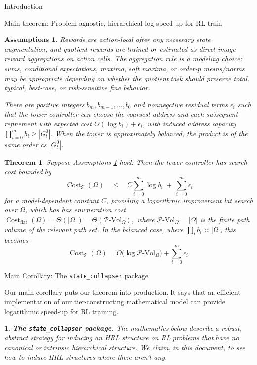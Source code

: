 \documentclass[11pt]{article}
\newtheorem{assumptions}[subsubsection]{Assumptions}
\newtheorem{ermark}[subsubsection]{}
\newtheorem{theorem}[subsubsection]{Theorem}
\newcommand{\PVol}{\mathcal{P}\text{-}\mathrm{Vol}}
\newcommand{\cost}{\operatorname{Cost}}
\begin{document}
\begin{section}{Introduction}
\begin{subsection}{Main theorem: Problem agnostic, hierarchical log speed-up for RL train}
\begin{assumptions}\label{ass: simple ass}
Rewards are action-local after any necessary state augmentation, and quotient rewards are trained or estimated as direct-image reward aggregations on action cells. The aggregation rule is a modeling choice: sums, conditional expectations, maxima, soft maxima, or order-$p$ means/norms may be appropriate depending on whether the quotient task should preserve total, typical, best-case, or risk-sensitive fine behavior.
 

There are positive integers \(b_m,b_{m-1},\ldots,b_0\) and nonnegative residual terms \(\epsilon_i\) such that the tower controller can choose the coarsest address and each subsequent refinement with expected cost
$O(\log b_i)+\epsilon_i$, with induced address capacity $\prod_{i=0}^{m} b_i \ge |G^{0}_{t}|$.
When the tower is approximately balanced, the product is of the same order as \(|G^{0}_{t}|\).
\end{assumptions}


\begin{theorem}\label{theorem: main}
Suppose Assumptions \ref{ass: simple ass} hold.  Then the tower controller has search cost bounded by
$$
    \cost_{\mathcal{T}}(\Omega)
    \quad\le\quad
    C\sum_{i=0}^{m}\log b_i \;+\; \sum_{i=0}^{m}\epsilon_i
$$
for a model-dependent constant \(C\), providing a logarithmic improvement lat search over \(\Omega\), which has has enumeration cost $
    \cost_{\mathrm{flat}}(\Omega)=\Theta(|\Omega|)=\Theta(\PVol_{\Omega}),
$
where \(\PVol_{\Omega}=|\Omega|\) is the finite path volume of the relevant path set.  In the balanced case, where \(\prod_i b_i\asymp |\Omega|\), this becomes
$$
    \cost_{\mathcal{T}}(\Omega)
    =O\bigl(\log \PVol_{\Omega}\bigr)+\sum_{i=0}^{m}\epsilon_i.
$$
\end{theorem}

\end{subsection}

\begin{subsection}{Main Corollary: The \texttt{state\_collapser} package}

Our main corollary puts our theorem into production. It says that an efficient implementation of our tier-constructing mathematical model can provide logarithmic speed-up for RL training.

\begin{ermark}
{\bf The \texttt{state\_collapser} package.}
\normalfont
The mathematics below describe a robust, abstract strategy for inducing an HRL structure on RL problems that have no canonical or intrinsic hierarchical structure. We claim, in this document, to see how to induce HRL structures where there aren't any.


\end{ermark}
\end{subsection}
\end{section}
\end{document}
